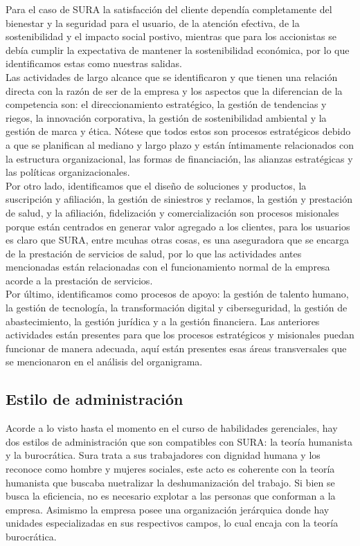 \documentclass[onecolumn]{article} %
\begin{document}
	Para el caso de SURA la satisfacción del cliente dependía completamente del bienestar y la seguridad para el usuario, de la atención efectiva, de la sostenibilidad y el impacto social postivo, mientras que para los accionistas se debía cumplir la expectativa de mantener la sostenibilidad económica, por lo que identificamos estas como nuestras salidas.\\
	
	Las actividades de largo alcance que se identificaron y que tienen una relación directa con la razón de ser de la empresa y los aspectos que la diferencian de la competencia son: el direccionamiento estratégico, la gestión de tendencias y riegos, la innovación corporativa, la gestión de sostenibilidad ambiental y la gestión de marca y ética. Nótese que todos estos son procesos estratégicos debido a que se planifican al mediano y largo plazo y están íntimamente relacionados con la estructura organizacional, las formas de financiación, las alianzas estratégicas y las políticas organizacionales.\\
	
	Por otro lado, identificamos que el diseño de soluciones y productos, la suscripción y afiliación, la gestión de siniestros y reclamos, la gestión y prestación de salud, y la afiliación, fidelización y comercialización son procesos misionales porque están centrados en generar valor agregado a los clientes, para los usuarios es claro que SURA, entre mcuhas otras cosas, es una aseguradora que se encarga de la prestación de servicios de salud, por lo que las actividades antes mencionadas están relacionadas con el funcionamiento normal de la empresa acorde a la prestación de servicios.\\
	
	Por último, identificamos como procesos de apoyo: la gestión de talento humano, la gestión de tecnología, la transformación digital y ciberseguridad, la gestión de abastecimiento, la gestión jurídica y a la gestión financiera. Las anteriores actividades están presentes para que los procesos estratégicos y misionales puedan funcionar de manera adecuada, aquí están presentes esas áreas transversales que se mencionaron en el análisis del organigrama.
	
	
	\subsection{Estilo de administración}
	
	Acorde a lo visto hasta el momento en el curso de habilidades gerenciales, hay dos estilos de administración que son compatibles con SURA: la teoría humanista y la burocrática. Sura trata a sus trabajadores con dignidad humana y los reconoce como hombre y mujeres sociales, este acto es coherente con la teoría humanista que buscaba nuetralizar la deshumanización del trabajo. Si bien se busca la eficiencia, no es necesario explotar a las personas que conforman a la empresa. Asimismo la empresa posee una organización jerárquica donde hay unidades especializadas en sus respectivos campos, lo cual encaja con la teoría burocrática.\\
	
\end{document}
